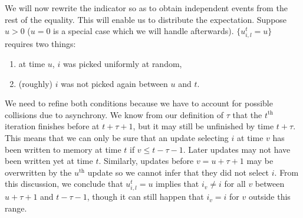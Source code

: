 \documentclass[twoside, 11pt]{article}
\newcommand{\overlap}{\tau}
\begin{document}
We will now rewrite the indicator so as to obtain independent events from the rest of the equality.
This will enable us to distribute the expectation.
Suppose $u>0$ ($u=0$ is a special case which we will handle afterwards). $\{u_{i, l}^t = u\}$ requires two things:
\begin{enumerate}
\item at time $u$, $i$ was picked uniformly at random,
\item (roughly) $i$ was not picked again between $u$ and $t$.
\end{enumerate}
We need to refine both conditions because we have to account for possible collisions due to asynchrony.
We know from our definition of $\overlap$ that the $t^\mathrm{th}$ iteration finishes before at $t + \overlap + 1$, but it may still be unfinished by time $t + \overlap$.
This means that we can only be sure that an update selecting $i$ at time $v$ has been written to memory at time $t$ if $v \leq t -\overlap -1$.
Later updates may not have been written yet at time $t$.
Similarly, updates before $v = u + \overlap +1$ may be overwritten by the $u^\mathrm{th}$ update so we cannot infer that they did not select $i$. From this discussion, we conclude that $u_{i, l}^t = u$ implies that $i_v \neq i$ for all $v$ between $u+\overlap+1$ and $t-\overlap-1$, though it can still happen that $i_v = i$ for $v$ outside this range.
\end{document}
